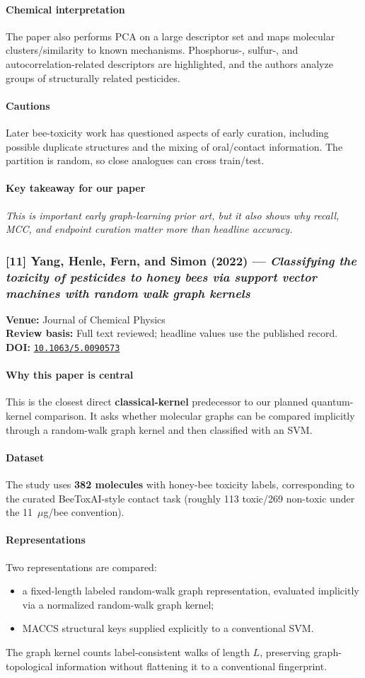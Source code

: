 \documentclass[11pt]{article}
\newcommand{\reviewfield}[2]{\paragraph{#1}#2}
\newcommand{\keytakeaway}[1]{\paragraph{Key takeaway for our paper}\emph{#1}}
\newcommand{\paperdoi}[1]{\href{https://doi.org/#1}{\texttt{#1}}}
\begin{document}
\reviewfield{Chemical interpretation}{
The paper also performs PCA on a large descriptor set and maps molecular clusters/similarity to known mechanisms. Phosphorus-, sulfur-, and autocorrelation-related descriptors are highlighted, and the authors analyze groups of structurally related pesticides.
}

\reviewfield{Cautions}{
Later bee-toxicity work has questioned aspects of early curation, including possible duplicate structures and the mixing of oral/contact information. The partition is random, so close analogues can cross train/test.
}

\keytakeaway{This is important early graph-learning prior art, but it also shows why recall, MCC, and endpoint curation matter more than headline accuracy.}

\subsubsection{[11] Yang, Henle, Fern, and Simon (2022) --- \textit{Classifying the toxicity of pesticides to honey bees via support vector machines with random walk graph kernels}}
\textbf{Venue:} Journal of Chemical Physics\\
\textbf{Review basis:} Full text reviewed; headline values use the published record.\\
\textbf{DOI:} \paperdoi{10.1063/5.0090573}

\reviewfield{Why this paper is central}{
This is the closest direct \textbf{classical-kernel} predecessor to our planned quantum-kernel comparison. It asks whether molecular graphs can be compared implicitly through a random-walk graph kernel and then classified with an SVM.
}

\reviewfield{Dataset}{
The study uses \textbf{382 molecules} with honey-bee toxicity labels, corresponding to the curated BeeToxAI-style contact task (roughly 113 toxic/269 non-toxic under the 11~$\mu$g/bee convention).
}

\reviewfield{Representations}{
Two representations are compared:
\begin{itemize}
    \item a fixed-length labeled random-walk graph representation, evaluated implicitly via a normalized random-walk graph kernel;
    \item MACCS structural keys supplied explicitly to a conventional SVM.
\end{itemize}
The graph kernel counts label-consistent walks of length $L$, preserving graph-topological information without flattening it to a conventional fingerprint.
}
\end{document}
